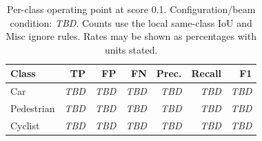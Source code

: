 \documentclass[10pt,twocolumn]{article}
\newcommand{\TBD}{\textit{TBD}}
\begin{document}
\begin{table}[t]
\centering\small
\caption{Per-class operating point at score 0.1. Configuration/beam condition: \TBD. Counts use the local same-class IoU and Misc ignore rules. Rates may be shown as percentages with units stated.}
\label{tab:operating}
\begin{tabular}{lrrrrrr}
\toprule
Class & TP & FP & FN & Prec. & Recall & F1\\
\midrule
Car & \TBD & \TBD & \TBD & \TBD & \TBD & \TBD\\
Pedestrian & \TBD & \TBD & \TBD & \TBD & \TBD & \TBD\\
Cyclist & \TBD & \TBD & \TBD & \TBD & \TBD & \TBD\\
\bottomrule
\end{tabular}
\end{table}
\end{document}
